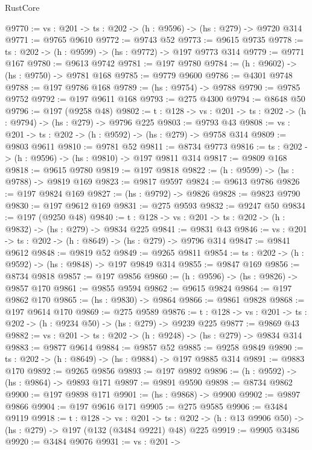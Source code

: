 \begin{lexlean}{RustCore}
\begin{coremodule}
@9770 := {vs : @201} -> {ts : @202} -> (h : @9596) -> (hs : @279) -> @9720 @314
@9771 := @9765 @9610
@9772 := @9743 @52
@9773 := @9615 @9735
@9778 := {ts : @202} -> (h : @9599) -> (hs : @9772) -> @197 @9773 @314
@9779 := @9771 @167
@9780 := @9613 @9742
@9781 := @197 @9780
@9784 := (h : @9602) -> (hs : @9750) -> @9781 @168
@9785 := @9779 @9600
@9786 := @4301 @9748
@9788 := @197 @9786 @168
@9789 := (hs : @9754) -> @9788
@9790 := @9785 @9752
@9792 := @197 @9611 @168
@9793 := @275 @4300
@9794 := @8648 @50
@9796 := @197 (@9258 @48)
@9802 := {t : @128} -> {vs : @201} -> {ts : @202} -> (h : @9794) -> (hs : @279) -> @9796 @225
@9803 := @9793 @43
@9808 := {vs : @201} -> {ts : @202} -> (h : @9592) -> (hs : @279) -> @9758 @314
@9809 := @9803 @9611
@9810 := @9781 @52
@9811 := @8734 @9773
@9816 := {ts : @202} -> (h : @9596) -> (hs : @9810) -> @197 @9811 @314
@9817 := @9809 @168
@9818 := @9615 @9780
@9819 := @197 @9818
@9822 := (h : @9599) -> (hs : @9788) -> @9819 @169
@9823 := @9817 @9597
@9824 := @9613 @9786
@9826 := @197 @9824 @169
@9827 := (hs : @9792) -> @9826
@9828 := @9823 @9790
@9830 := @197 @9612 @169
@9831 := @275 @9593
@9832 := @9247 @50
@9834 := @197 (@9250 @48)
@9840 := {t : @128} -> {vs : @201} -> {ts : @202} -> (h : @9832) -> (hs : @279) -> @9834 @225
@9841 := @9831 @43
@9846 := {vs : @201} -> {ts : @202} -> (h : @8649) -> (hs : @279) -> @9796 @314
@9847 := @9841 @9612
@9848 := @9819 @52
@9849 := @9265 @9811
@9854 := {ts : @202} -> (h : @9592) -> (hs : @9848) -> @197 @9849 @314
@9855 := @9847 @169
@9856 := @8734 @9818
@9857 := @197 @9856
@9860 := (h : @9596) -> (hs : @9826) -> @9857 @170
@9861 := @9855 @9594
@9862 := @9615 @9824
@9864 := @197 @9862 @170
@9865 := (hs : @9830) -> @9864
@9866 := @9861 @9828
@9868 := @197 @9614 @170
@9869 := @275 @9589
@9876 := {t : @128} -> {vs : @201} -> {ts : @202} -> (h : @9234 @50) -> (hs : @279) -> @9239 @225
@9877 := @9869 @43
@9882 := {vs : @201} -> {ts : @202} -> (h : @9248) -> (hs : @279) -> @9834 @314
@9883 := @9877 @9614
@9884 := @9857 @52
@9885 := @9258 @9849
@9890 := {ts : @202} -> (h : @8649) -> (hs : @9884) -> @197 @9885 @314
@9891 := @9883 @170
@9892 := @9265 @9856
@9893 := @197 @9892
@9896 := (h : @9592) -> (hs : @9864) -> @9893 @171
@9897 := @9891 @9590
@9898 := @8734 @9862
@9900 := @197 @9898 @171
@9901 := (hs : @9868) -> @9900
@9902 := @9897 @9866
@9904 := @197 @9616 @171
@9905 := @275 @9585
@9906 := @3484 @9119
@9918 := {t : @128} ->
  {vs : @201} ->
  {ts : @202} -> (h : @13 @9906 @50) -> (hs : @279) -> @197 (@132 (@3484 @9221) @48) @225
@9919 := @9905 @3486
@9920 := @3484 @9076
@9931 := {vs : @201} ->

\end{coremodule}
\end{lexlean}
